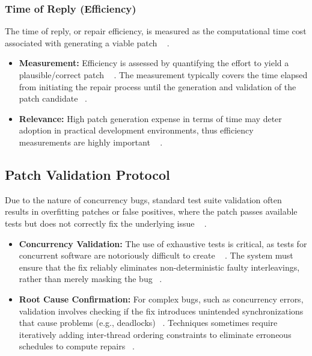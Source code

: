\subsubsection{Time of Reply (Efficiency)} The time of reply, or repair efficiency, is measured as the computational time cost associated with generating a viable patch ~\cite{liu2021_1}
.
\begin{itemize} \item \textbf{Measurement:} Efficiency is assessed by quantifying the effort to yield a plausible/correct patch ~\cite{liu2021_1}
. The measurement typically covers the time elapsed from initiating the repair process until the generation and validation of the patch candidate ~\cite{liu2021_1}. \item \textbf{Relevance:} High patch generation expense in terms of time may deter adoption in practical development environments, thus efficiency measurements are highly important ~\cite{liu2021_1}
. \end{itemize}
\subsection{Patch Validation Protocol}
Due to the nature of concurrency bugs, standard test suite validation often results in overfitting patches or false positives, where the patch passes available tests but does not correctly fix the underlying issue ~\cite{yang2023,liu2021_1}
.
\begin{itemize} \item \textbf{Concurrency Validation:} The use of exhaustive tests is critical, as tests for concurrent software are notoriously difficult to create ~\cite{abbaspour2016}
. The system must ensure that the fix reliably eliminates non-deterministic faulty interleavings, rather than merely masking the bug ~\cite{liu2021_1}. \item \textbf{Root Cause Confirmation:} For complex bugs, such as concurrency errors, validation involves checking if the fix introduces unintended synchronizations that cause problems (e.g., deadlocks) ~\cite{liu2021_2,deng2015f}. Techniques sometimes require iteratively adding inter-thread ordering constraints to eliminate erroneous schedules to compute repairs ~\cite{khoshnood2015}. \end{itemize}